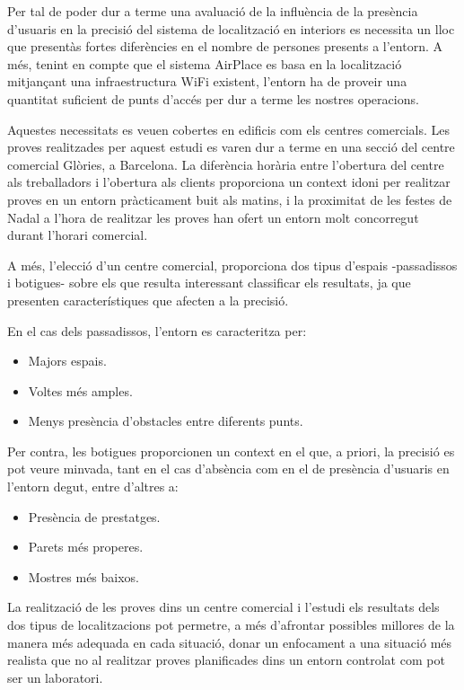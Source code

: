 
Per tal de poder dur a terme una avaluació de la influència de la presència d'usuaris en la precisió del sistema de localització en interiors es necessita un lloc que presentàs fortes diferències en el nombre de persones presents a l'entorn. A més, tenint en compte que el sistema AirPlace es basa en la localització mitjançant una infraestructura WiFi existent, l'entorn ha de proveir una quantitat suficient de punts d'accés per dur a terme les nostres operacions.

Aquestes necessitats es veuen cobertes en edificis com els centres comercials. Les proves realitzades per aquest estudi es varen dur a terme en una secció del centre comercial Glòries, a Barcelona. La diferència horària entre l'obertura del centre als treballadors i l'obertura als clients proporciona un context idoni per realitzar proves en un entorn pràcticament buit als matins, i la proximitat de les festes de Nadal a l'hora de realitzar les proves han ofert un entorn molt concorregut durant l'horari comercial.

A més, l'elecció d'un centre comercial, proporciona dos tipus d'espais -passadissos i botigues- sobre els que resulta interessant classificar els resultats, ja que presenten característiques que afecten a la precisió.

En el cas dels passadissos, l'entorn es caracteritza per:

\begin{itemize}
    \item Majors espais.
    \item Voltes més amples.
    \item Menys presència d'obstacles entre diferents punts.
\end{itemize}

Per contra, les botigues proporcionen un context en el que, a priori, la precisió es pot veure minvada, tant en el cas d'absència com en el de presència d'usuaris en l'entorn degut, entre d'altres a:

\begin{itemize}
    \item Presència de prestatges.
    \item Parets més properes.
    \item Mostres més baixos.
\end{itemize}

La realització de les proves dins un centre comercial i l'estudi els resultats dels dos tipus de localitzacions pot permetre, a més d'afrontar possibles millores de la manera més adequada en cada situació, donar un enfocament a una situació més realista que no al realitzar proves planificades dins un entorn controlat com pot ser un laboratori.


